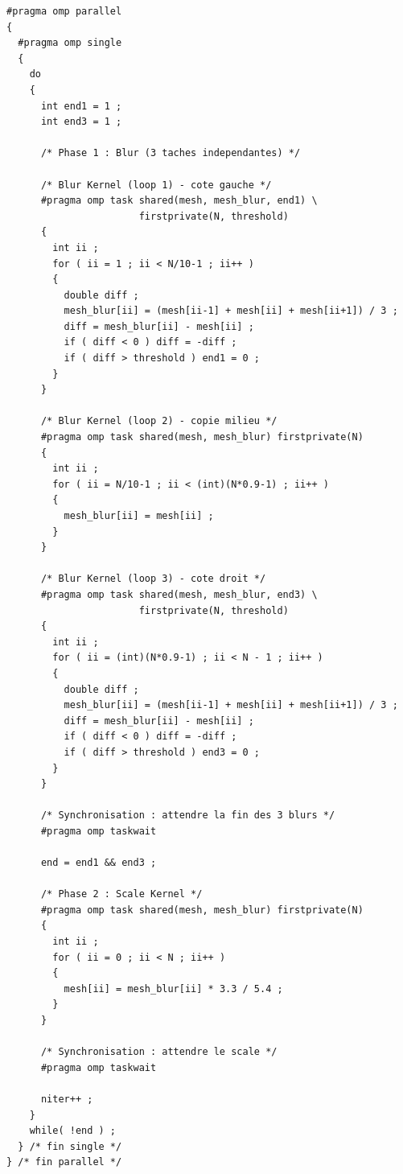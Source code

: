 \documentclass[12pt,a4paper]{article}
\begin{document}
\begin{lstlisting}[caption={Stencil avec tâches + \texttt{taskwait} --- Q.7a}]
#pragma omp parallel
{
  #pragma omp single
  {
    do
    {
      int end1 = 1 ;
      int end3 = 1 ;

      /* Phase 1 : Blur (3 taches independantes) */

      /* Blur Kernel (loop 1) - cote gauche */
      #pragma omp task shared(mesh, mesh_blur, end1) \
                       firstprivate(N, threshold)
      {
        int ii ;
        for ( ii = 1 ; ii < N/10-1 ; ii++ )
        {
          double diff ;
          mesh_blur[ii] = (mesh[ii-1] + mesh[ii] + mesh[ii+1]) / 3 ;
          diff = mesh_blur[ii] - mesh[ii] ;
          if ( diff < 0 ) diff = -diff ;
          if ( diff > threshold ) end1 = 0 ;
        }
      }

      /* Blur Kernel (loop 2) - copie milieu */
      #pragma omp task shared(mesh, mesh_blur) firstprivate(N)
      {
        int ii ;
        for ( ii = N/10-1 ; ii < (int)(N*0.9-1) ; ii++ )
        {
          mesh_blur[ii] = mesh[ii] ;
        }
      }

      /* Blur Kernel (loop 3) - cote droit */
      #pragma omp task shared(mesh, mesh_blur, end3) \
                       firstprivate(N, threshold)
      {
        int ii ;
        for ( ii = (int)(N*0.9-1) ; ii < N - 1 ; ii++ )
        {
          double diff ;
          mesh_blur[ii] = (mesh[ii-1] + mesh[ii] + mesh[ii+1]) / 3 ;
          diff = mesh_blur[ii] - mesh[ii] ;
          if ( diff < 0 ) diff = -diff ;
          if ( diff > threshold ) end3 = 0 ;
        }
      }

      /* Synchronisation : attendre la fin des 3 blurs */
      #pragma omp taskwait

      end = end1 && end3 ;

      /* Phase 2 : Scale Kernel */
      #pragma omp task shared(mesh, mesh_blur) firstprivate(N)
      {
        int ii ;
        for ( ii = 0 ; ii < N ; ii++ )
        {
          mesh[ii] = mesh_blur[ii] * 3.3 / 5.4 ;
        }
      }

      /* Synchronisation : attendre le scale */
      #pragma omp taskwait

      niter++ ;
    }
    while( !end ) ;
  } /* fin single */
} /* fin parallel */
\end{lstlisting}
\end{document}
